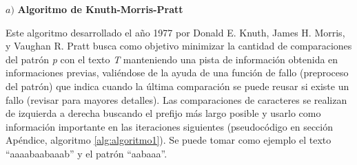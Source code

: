 $a)$ \textbf{Algoritmo de Knuth-Morris-Pratt}

Este algoritmo desarrollado el año 1977 por Donald E. Knuth, James H. Morris, y Vaughan R. Pratt busca como objetivo minimizar la cantidad de comparaciones del patrón \textit{p} con el texto \textit{T} manteniendo una pista de información obtenida en informaciones previas, valiéndose de la ayuda de una función de fallo (preproceso del patrón) que indica cuando la última comparación se puede reusar si existe un fallo (revisar \cite{knuthmorrispratt} para mayores detalles). Las comparaciones de caracteres se realizan de izquierda a derecha buscando el prefijo más largo posible y usarlo como información importante en las iteraciones siguientes (pseudocódigo en sección Apéndice, algoritmo \ref{alg:algoritmo1}). Se puede tomar como ejemplo el texto ``aaaabaabaaab'' y el patrón ``aabaaa''.
\\
